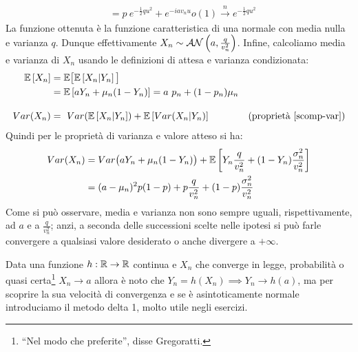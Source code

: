 \begin{cese}
\begin{align*}
		&= p \ e^{- \frac 1 2 q u^2} + e^{-i a v_n u} o(1) \overset{n}{\longrightarrow} e^{- \frac 1 2 q u^2 }
	\end{align*}
	La funzione ottenuta è la funzione caratteristica di una normale con media nulla e varianza $q$. Dunque effettivamente $ X_n \sim \mathcal A\mathcal N\left( a, \frac q {v_n^2} \right)$. Infine, calcoliamo media e varianza di $X_n$ usando le definizioni di attesa e varianza condizionata:
	\begin{align*}
		\mathbb E \left[ X_n \right] &= \mathbb E \big[ \mathbb E \left[ X_n | Y_n \right] \big] \\
		&=\mathbb E \left[  a Y_n + \mu_n (1-Y_n)  \right] = a \ p_n + (1 - p_n) \mu_n\\[10pt]
		Var(X_n) &=\ Var ( \mathbb E \left[ X_n|Y_n \right] ) + \mathbb E \left[  Var( X_n|Y_n )  \right] & (\text{proprietà \ref{scomp-var}})
	\end{align*}
	Quindi per le proprietà di varianza e valore atteso si ha:
	\begin{align*}
		Var(X_n) &= Var \big(aY_n + \mu_n(1-Y_n)\big) + \mathbb E \left[  Y_n \frac q {v_n^2} + (1-Y_n) \frac{\sigma_n^2}{v_n^2}  \right] \\
		&= (a - \mu_n)^2 p (1-p) + p \frac q {v_n^2} + (1-p) \frac{\sigma_n^2}{v_n^2}
	\end{align*}
	Come si può osservare, media e varianza non sono sempre uguali, rispettivamente, ad $a$ e a $\frac q {v_n^2}$; anzi, a seconda delle successioni scelte nelle ipotesi si può farle convergere a qualsiasi valore desiderato o anche divergere a $+\infty$.
\end{cese}

Data una funzione $h:\mathbb R \to \mathbb R$ continua e $X_n$ che converge in legge, probabilità o quasi certa\footnote{``Nel modo che preferite'', disse Gregoratti.} $X_n \longrightarrow a$ allora è noto che $Y_n = h(X_n) \implies Y_n \longrightarrow h(a)$, ma per scoprire la sua velocità di convergenza e se è asintoticamente normale introduciamo il metodo delta 1, molto utile negli esercizi.
\medskip

